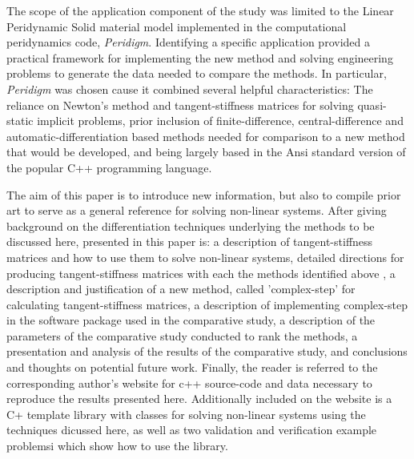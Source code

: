 \documentclass[preprint,12pt]{elsarticle}
\begin{document}
The scope of the application component of the study was limited to the Linear Peridynamic Solid
material model implemented in the computational peridynamics code, \textit{Peridigm}. Identifying a
specific application provided a practical framework for implementing the new method and solving
engineering problems to generate the data needed to compare the methods. In particular,
\emph{Peridigm} was chosen cause it combined several helpful characteristics: The reliance on
Newton's method and tangent-stiffness matrices for solving quasi-static implicit problems, prior
inclusion of finite-difference, central-difference and automatic-differentiation based methods
needed for comparison to a new method that would be developed, and being largely based in the Ansi
standard version of the popular C++ programming language.

The aim of this paper is to introduce new information, but also to compile prior art to serve as a
general reference for solving non-linear systems.  After giving background on the
 differentiation techniques underlying the methods to be
discussed here, presented in this paper is: a description of tangent-stiffness matrices and how to
use them to solve non-linear systems, detailed directions for producing tangent-stiffness matrices
with each the methods identified above , a description and justification of a new method, called 'complex-step' for calculating
tangent-stiffness matrices, a description of implementing complex-step in the software package used
in the comparative study, a description of the parameters of the comparative study conducted to rank
the methods, a presentation and analysis of the results of the comparative study, and
conclusions and thoughts on potential future work. Finally, the reader is referred to the
corresponding author's website for c++ source-code and data necessary to reproduce the results
presented here. Additionally included on the website is a C+ template library with classes for
solving non-linear systems using the techniques dicussed here, as well as two validation and
verification example problemsi which show how to use the library.
\end{document}
